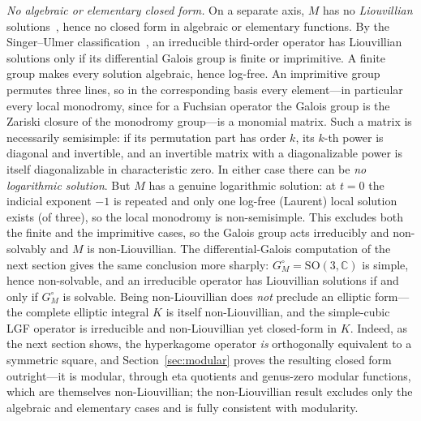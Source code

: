 \documentclass[11pt]{article}
\theoremstyle{plain}
\theoremstyle{remark}
\begin{document}
\emph{No algebraic or elementary closed form.} On a separate axis, $M$ has no
\emph{Liouvillian} solutions~\cite{vdPutSinger}, hence no closed form in algebraic or elementary functions. By the
Singer--Ulmer classification~\cite{SingerUlmer}, an irreducible third-order operator has Liouvillian solutions only
if its differential Galois group is finite or imprimitive. A finite group makes every solution algebraic, hence log-free. An imprimitive group
permutes three lines, so in the corresponding basis every element---in particular every local monodromy, since for
a Fuchsian operator the Galois group is the Zariski closure of the monodromy group---is a monomial matrix. Such a
matrix is necessarily semisimple: if its permutation part has order $k$, its $k$-th power is diagonal and
invertible, and an invertible matrix with a diagonalizable power is itself diagonalizable in characteristic zero.
In either case there can be \emph{no logarithmic solution}. But $M$ has a genuine logarithmic solution:
at $t=0$ the indicial exponent $-1$ is repeated and only one log-free (Laurent) local solution exists (of three),
so the local monodromy is non-semisimple. This excludes both the finite and the imprimitive cases, so the Galois
group acts irreducibly and non-solvably and $M$ is non-Liouvillian. The differential-Galois computation of the next
section gives the same conclusion more sharply: $G_M^\circ=\mathrm{SO}(3,\mathbb{C})$ is simple, hence non-solvable,
and an irreducible operator has Liouvillian solutions if and only if $G_M^\circ$ is solvable. Being non-Liouvillian
does \emph{not} preclude an elliptic form---the complete elliptic integral $K$ is itself non-Liouvillian, and the
simple-cubic LGF operator is irreducible and non-Liouvillian yet closed-form in $K$. Indeed, as the next section
shows, the hyperkagome operator \emph{is} orthogonally equivalent to a symmetric square, and Section~\ref{sec:modular}
proves the resulting closed form outright---it is modular, through eta quotients and genus-zero modular
functions, which are themselves non-Liouvillian; the non-Liouvillian result excludes only the algebraic and elementary cases and is
fully consistent with modularity.
\end{document}
